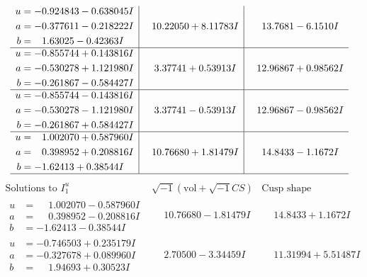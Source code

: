 \documentclass[1p]{elsarticle_modified}
\theoremstyle{definition}
\newcommand{\I}{\sqrt{-1}}
\begin{document}
$$\begin{array}{c|c|c}
\begin{aligned}
u &= -0.924843 - 0.638045 I \\
a &= -0.377611 - 0.218222 I \\
b &= \phantom{-}1.63025 - 0.42363 I\end{aligned}
 & \phantom{-}10.22050 + 8.11783 I & \phantom{-}13.7681 - 6.1510 I \\ \hline\begin{aligned}
u &= -0.855744 + 0.143816 I \\
a &= -0.530278 + 1.121980 I \\
b &= -0.261867 - 0.584427 I\end{aligned}
 & \phantom{-}3.37741 + 0.53913 I & \phantom{-}12.96867 + 0.98562 I \\ \hline\begin{aligned}
u &= -0.855744 - 0.143816 I \\
a &= -0.530278 - 1.121980 I \\
b &= -0.261867 + 0.584427 I\end{aligned}
 & \phantom{-}3.37741 - 0.53913 I & \phantom{-}12.96867 - 0.98562 I \\ \hline\begin{aligned}
u &= \phantom{-}1.002070 + 0.587960 I \\
a &= \phantom{-}0.398952 + 0.208816 I \\
b &= -1.62413 + 0.38544 I\end{aligned}
 & \phantom{-}10.76680 + 1.81479 I & \phantom{-}14.8433 - 1.1672 I\\
 \hline 
 \end{array}$$\newpage$$\begin{array}{c|c|c}  
\text{Solutions to }I^u_{1}& \I (\text{vol} + \sqrt{-1}CS) & \text{Cusp shape}\\
 \hline 
\begin{aligned}
u &= \phantom{-}1.002070 - 0.587960 I \\
a &= \phantom{-}0.398952 - 0.208816 I \\
b &= -1.62413 - 0.38544 I\end{aligned}
 & \phantom{-}10.76680 - 1.81479 I & \phantom{-}14.8433 + 1.1672 I \\ \hline\begin{aligned}
u &= -0.746503 + 0.235179 I \\
a &= -0.327678 + 0.089960 I \\
b &= \phantom{-}1.94693 + 0.30523 I\end{aligned}
 & \phantom{-}2.70500 - 3.34459 I & \phantom{-}11.31994 + 5.51487 I \\ \hline\begin{aligned}

\end{aligned}
\end{array}$$
\end{document}
